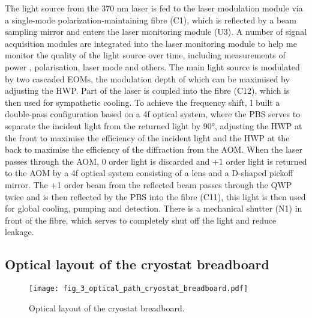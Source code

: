 The light source from the 370 nm laser is fed to the laser modulation module via a single-mode polarization-maintaining fibre (C1), which is reflected by a beam sampling mirror and enters the laser monitoring module (U3). A number of signal acquisition modules are integrated into the laser monitoring module to help me monitor the quality of the light source over time, including measurements of power , polarisation, laser mode and others. The main light source is modulated by two cascaded EOMs, the modulation depth of which can be maximised by adjusting the HWP. Part of the laser is coupled into the fibre (C12), which is then used for sympathetic cooling. To achieve the frequency shift, I built a double-pass configuration based on a 4f optical system, where the PBS serves to separate the incident light from the returned light by 90°, adjusting the HWP at the front to maximise the efficiency of the incident light and the HWP at the back to maximise the efficiency of the diffraction from the AOM. When the laser passes through the AOM, 0 order light is discarded and +1 order light is returned to the AOM by a 4f optical system consisting of a lens and a D-shaped pickoff mirror. The +1 order beam from the reflected beam passes through the QWP twice and is then reflected by the PBS into the fibre (C11), this light is then used for global cooling, pumping and detection. There is a mechanical shutter (N1) in front of the fibre, which serves to completely shut off the light and reduce leakage.

\subsection{Optical layout of the cryostat breadboard}

\begin{figure}
    \centering
    \texttt{[image: fig\_3\_optical\_path\_cryostat\_breadboard.pdf]}
    \caption{Optical layout of the cryostat breadboard.}
    \label{fig:fig_3_optical_path_cryostat_breadboard}
\end{figure}

